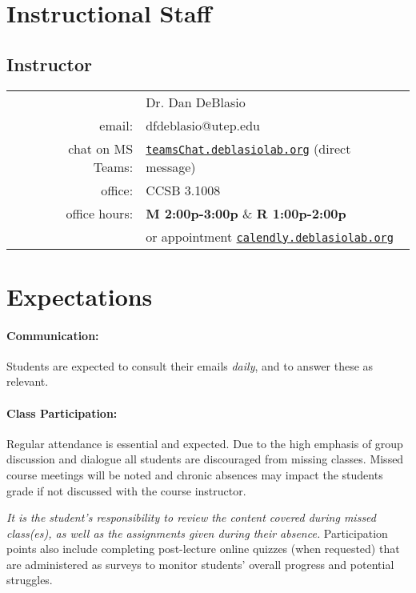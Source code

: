 \documentclass[12pt]{scrartcl}
\begin{document}
\section{Instructional Staff}

\subsection{Instructor}
\begin{tabular}{lrl}
& & Dr. Dan DeBlasio  \\
 & email: & dfdeblasio@utep.edu\\
 & chat on MS Teams: &  \href{http://teamsChat.deblasiolab.org}{\texttt{teamsChat.deblasiolab.org}} (direct message)\\
 & office: & CCSB 3.1008\\
 & office hours: & \textbf{M 2:00p-3:00p} \& \textbf{R 1:00p-2:00p}\\
 & & or appointment \href{http://calendly.deblasiolab.org}{\texttt{calendly.deblasiolab.org}}\\
\end{tabular}


\section{Expectations}

\paragraph{Communication:} Students are expected to consult their emails \textit{daily}, and to answer these as relevant. 

\paragraph{Class Participation:} 
Regular attendance is essential and expected. 
Due to the high emphasis of group discussion and dialogue all students are discouraged from missing classes. 
Missed course meetings will be noted and chronic absences may impact the students grade if not discussed with the course instructor.

\textit{It is the student's responsibility to review the content covered during missed class(es), as well as the assignments given during their absence.}
Participation points also include completing post-lecture online quizzes (when requested) that are administered as surveys to monitor students’ overall progress and potential struggles.
\end{document}
